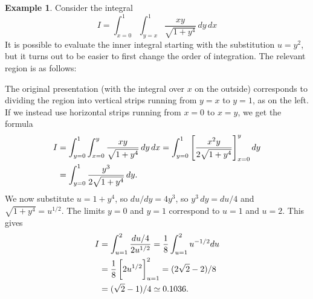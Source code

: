 \documentclass[reqno]{amsart}
\theoremstyle{definition}
\newtheorem{example}[theorem]{Example}
\begin{document}
\begin{example}
 Consider the integral
 \[ I = \int_{x=0}^1 \int_{y=x}^1 \frac{xy}{\sqrt{1+y^4}}\,dy\,dx \]
 It is possible to evaluate the inner integral starting with the
 substitution $u=y^2$, but it turns out to be easier to first change
 the order of integration.  The relevant region is as follows:
 \begin{center}
  \hspace{5em}
 \end{center}
 The original presentation (with the integral over $x$ on the outside)
 corresponds to dividing the region into vertical strips running from
 $y=x$ to $y=1$, as on the left.  If we instead use horizontal strips
 running from $x=0$ to $x=y$, we get the formula
 \begin{align*}
  I &= \int_{y=0}^1 \int_{x=0}^y \frac{xy}{\sqrt{1+y^4}}\,dy\,dx
     = \int_{y=0}^1 \CH{\frac{x^2y}{2\sqrt{1+y^4}}}_{x=0}^y dy \\
    &= \int_{y=0}^1 \frac{y^3}{2\sqrt{1+y^4}}\,dy.
 \end{align*}
 We now substitute $u=1+y^4$, so $du/dy=4y^3$, so $y^3\,dy=du/4$ and
 $\sqrt{1+y^4}=u^{1/2}$.  The limits $y=0$ and $y=1$ correspond to
 $u=1$ and $u=2$.  This gives
 \begin{align*}
  I &= \int_{u=1}^2 \frac{du/4}{2u^{1/2}} 
     = \frac{1}{8}\int_{u=1}^2 u^{-1/2}du \\
    &= \frac{1}{8} \CH{2u^{1/2}}_{u=1}^2 
     = (2\sqrt{2}-2)/8 \\
    &= (\sqrt{2}-1)/4 \simeq 0.1036.
 \end{align*}
\end{example}
\end{document}
